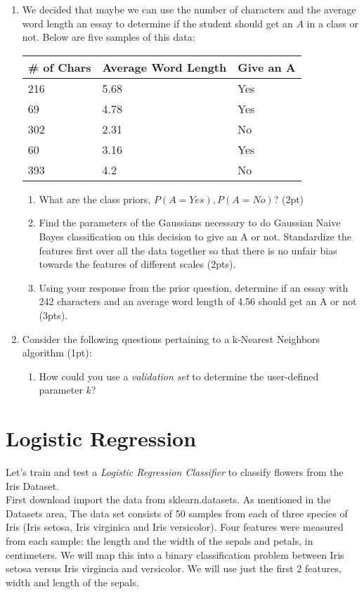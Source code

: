 \documentclass[12pt]{article}
\begin{document}
\begin{enumerate}
\item We decided that maybe we can use the number of characters and the average word length an essay to determine if the student should get an $A$ in a class or not.  Below are five samples of this data:
\begin{table}[h]
\begin{center}
\begin{tabular}{|l|l|l|}
\hline
\# of Chars & Average Word Length & Give an A\\
\hline
216 & 5.68 & Yes\\
69 & 4.78 & Yes\\
302 & 2.31 & No \\
60 & 3.16 & Yes \\
393 & 4.2 & No\\
\hline
\end{tabular}
\end{center}
\end{table}
	\begin{enumerate}
	\item What are the class priors, $P(A=Yes), P(A=No)$? (2pt)
	\item Find the parameters of the Gaussians necessary to do Gaussian Naive Bayes classification on this decision to give an A or not.  Standardize the features first over all the data together so that there is no unfair bias towards the features of different scales (2pts).
	\item Using your response from the prior question, determine if an essay with 242 characters and an average word length of 4.56 should get an A or not (3pts).
	\end{enumerate}
\item Consider the following questions pertaining to a k-Nearest Neighbors algorithm (1pt):
	\begin{enumerate}
	\item How could you use a \emph{validation set} to determine the user-defined parameter $k$?
	\end{enumerate}
\end{enumerate}


\newpage
\section{Logistic Regression}\label{naive}
Let's train and test a \emph{Logistic Regression Classifier} to classify flowers from the Iris Dataset.\\

\noindent
First download import the data from sklearn.datasets.  As mentioned in the Datasets area,  The data set consists of 50 samples from each of three species of Iris (Iris setosa, Iris virginica and Iris versicolor). Four features were measured from each sample: the length and the width of the sepals and petals, in centimeters.  We will map this into a binary classification problem between Iris setosa versus Iris virgincia and versicolor.  We will use just the first 2 features, width and length of the sepals.  
\end{document}
